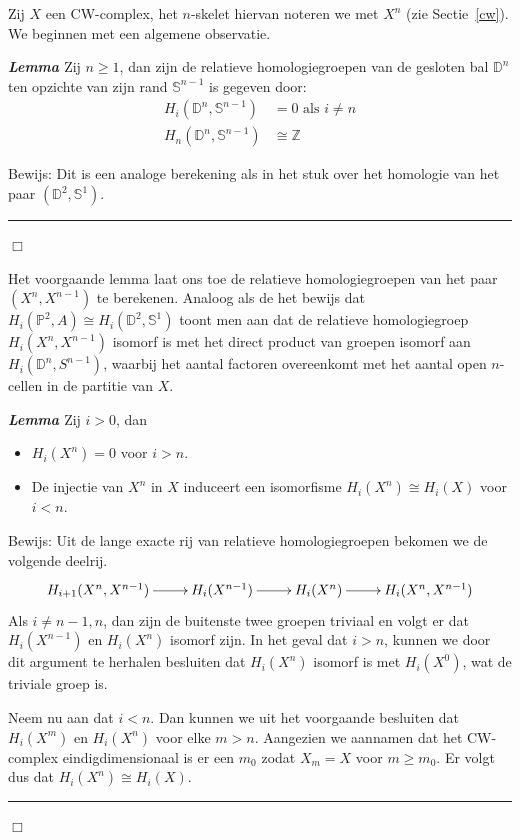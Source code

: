 \documentclass[12pt]{book}
\newcommand{\bew}{{\sc Bewijs: }}
\newcommand{\B}{\rule{1mm}{0mm} \hfill $\Box$ }
\newenvironment{lem}{\begin{lemh}{\em {\bf Lemma }}}{\end{lemh}}
\begin{document}
Zij $X$ een CW-complex, het $n$-skelet hiervan noteren we met $X^n$ (zie Sectie~\ref{cw}). We beginnen met een algemene observatie.

\begin{lem}
Zij $n \geq 1$, dan zijn de relatieve homologiegroepen van de gesloten bal $\mathbb{D}^n$ ten opzichte van zijn rand $\mathbb{S}^{n-1}$ is gegeven door:
\begin{align*}
H_i(\mathbb{D}^n, \mathbb{S}^{n-1}) & = 0 \mbox{ als } i \neq n \\
H_n(\mathbb{D}^n, \mathbb{S}^{n-1}) & \cong \mathbb{Z}
\end{align*} 
\end{lem}
\bew
Dit is een analoge berekening als in het stuk over het homologie van het paar $(\mathbb{D}^2, \mathbb{S}^1)$.
\B
\bigskip

Het voorgaande lemma laat ons toe de relatieve homologiegroepen van het paar $(X^n, X^{n-1})$ te berekenen.  Analoog als de het bewijs dat $H_i(\mathbb{P}^2,A) \cong H_i(\mathbb{D}^2, \mathbb{S}^1)$ toont men aan dat de relatieve homologiegroep $H_i(X^n, X^{n-1})$ isomorf is met het direct product van groepen isomorf aan $H_i(\mathbb{D}^n, S^{n-1})$, waarbij het aantal factoren overeenkomt met het aantal open $n$-cellen in de partitie van $X$.


\begin{lem} Zij $i > 0$, dan
\begin{itemize}
\item $H_i(X^n) = 0$ voor $ i > n$.
\item De injectie van $X^n$ in $X$ induceert een isomorfisme $H_i(X^n) \cong H_i(X)$ voor $i <n$. 
\end{itemize}
\end{lem}
\bew
Uit de lange exacte rij van relatieve homologiegroepen bekomen we de volgende deelrij.
$$
 \xymatrix{ H_{i+1}(X^n, X^{n-1})  \ar[r] & H_i(X^{n-1}) \ar[r] &  H_i(X^n) \ar[r] &  H_{i}(X^n, X^{n-1}) }
$$
Als $ i \neq n -1, n$, dan zijn de buitenste twee groepen triviaal en volgt er dat $H_i(X^{n-1}) $ en $H_i(X^n) $ isomorf zijn. In het geval  dat $i >n$, kunnen we door dit argument te herhalen besluiten dat $H_i(X^n)$ isomorf is met $H_i(X^0)$, wat de triviale groep is.

Neem nu aan dat $i<n$. Dan kunnen we uit het voorgaande besluiten dat $H_i(X^{m}) $ en $H_i(X^n)$ voor elke $m>n$.  Aangezien we aannamen dat het CW-complex eindigdimensionaal is er een $m_0$ zodat $X_m = X$ voor $m \geq m_0$. Er volgt dus dat $H_i(X^n) \cong H_i(X)$.
\B
\bigskip
\end{document}
